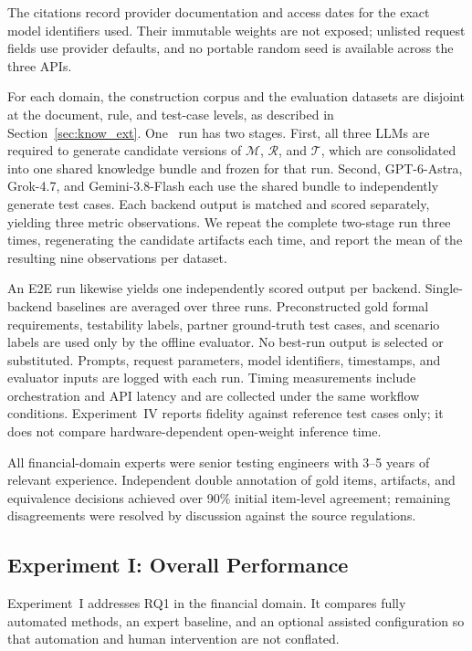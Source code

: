 The citations record provider documentation and access dates for the exact
model identifiers used. Their immutable weights are not exposed; unlisted
request fields use provider defaults, and no portable random seed is available
across the three APIs.

For each domain, the construction corpus and the evaluation datasets are
disjoint at the document, rule, and test-case levels, as described in
Section~\ref{sec:know_ext}. One \ourtool\ run has two stages. First, all three
LLMs are required to generate candidate versions of $\mathcal{M}$,
$\mathcal{R}$, and $\mathcal{T}$, which are consolidated into one shared
knowledge bundle and frozen for that run. Second, GPT-6-Astra, Grok-4.7, and
Gemini-3.8-Flash each use the shared bundle to independently generate test
cases. Each backend output is matched and scored separately, yielding three
metric observations. We repeat the complete two-stage run three times,
regenerating the candidate artifacts each time, and report the mean of the
resulting nine observations per dataset.

An E2E run likewise yields one independently scored output per backend.
Single-backend baselines are averaged over three runs.
Preconstructed gold formal requirements, testability labels, partner
ground-truth test cases, and scenario labels are used only by the offline
evaluator. No best-run output is selected or
substituted. Prompts, request parameters, model identifiers, timestamps, and
evaluator inputs are logged with each run. Timing measurements include
orchestration and API latency and are collected under the same workflow
conditions. Experiment~IV reports fidelity against reference test cases only; it does not
compare hardware-dependent open-weight inference time.

All financial-domain experts were senior testing engineers with 3--5 years of
relevant experience. Independent double annotation of gold items, artifacts,
and equivalence decisions achieved over 90\% initial item-level agreement;
remaining disagreements were resolved by discussion against the source
regulations.

\subsection{Experiment I: Overall Performance}
\label{sec:exp1}

Experiment~I addresses RQ1 in the financial domain. It compares fully
automated methods, an expert baseline, and an optional assisted configuration
so that automation and human intervention are not conflated.

